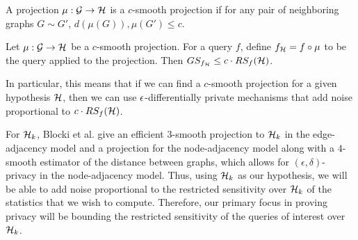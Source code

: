\begin{definition}
A projection $\mu: \mathcal{G} \to \mathcal{H}$ is a $c$-smooth projection if for any pair of neighboring graphs $G \sim G'$, $d(\mu(G)), \mu(G') \leq c$. 
\end{definition}

\begin{theorem}[]
\label{thm:restricted_sensitivity_mechanism}
Let $\mu: \mathcal{G} \to \mathcal{H}$ be a $c$-smooth projection. For a query $f$, define $f_{\mathcal{H}} = f \circ \mu$ to be the query applied to the projection. Then $GS_{f_{\mathcal{H}}} \leq c \cdot RS_f(\mathcal{H})$.
\end{theorem}

In particular, this means that if we can find a $c$-smooth projection for a given hypothesis $\mathcal{H}$, then we can use $\epsilon$-differentially private mechanisms that add noise proportional to $c \cdot RS_f(\mathcal{H})$.

For $\mathcal{H}_k$, Blocki et al. give an efficient $3$-smooth projection to $\mathcal{H}_k$ in the edge-adjacency model and a projection for the node-adjacency model along with a $4$-smooth estimator of the distance between graphs, which allows for $(\epsilon, \delta)$-privacy in the node-adjacency model. Thus, using $\mathcal{H}_k$ as our hypothesis, we will be able to add noise proportional to the restricted sensitivity over $\mathcal{H}_k$ of the statistics that we wish to compute. Therefore, our primary focus in proving privacy will be bounding the restricted sensitivity of the queries of interest over $\mathcal{H}_k$. 
